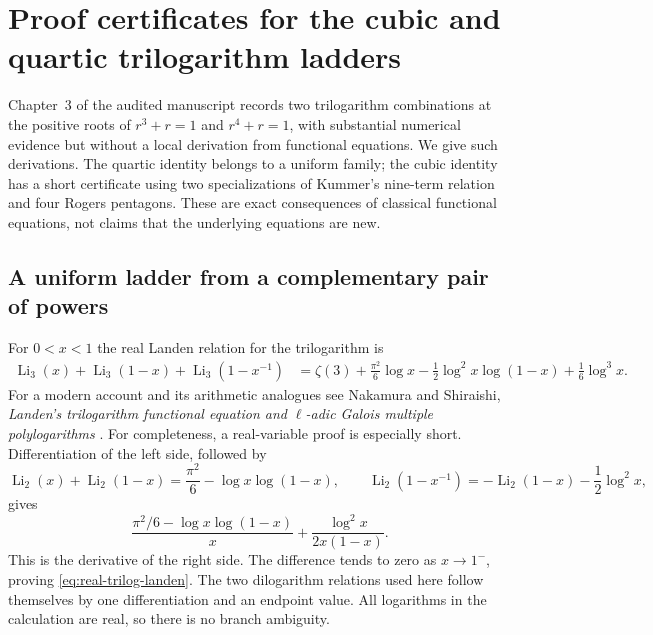 
\section{Proof certificates for the cubic and quartic trilogarithm ladders}
\label{sec:proved-small-ladders}

Chapter~3 of the audited manuscript records two trilogarithm combinations
at the positive roots of $r^3+r=1$ and $r^4+r=1$, with substantial numerical
evidence but without a local derivation from functional equations.
We give such derivations. The quartic identity belongs to a uniform
family; the cubic identity has a short certificate using two
specializations of Kummer's nine-term relation and four Rogers pentagons.
These are exact consequences of classical functional equations, not
claims that the underlying equations are new.

\subsection{A uniform ladder from a complementary pair of powers}

For $0<x<1$ the real Landen relation for the trilogarithm is
\begin{align}
\operatorname{Li}_3(x)+\operatorname{Li}_3(1-x)
 +\operatorname{Li}_3(1-x^{-1})
 &=\zeta(3)+\frac{\pi^2}{6}\log x
 -\frac12\log^2x\log(1-x)+\frac16\log^3x.
\label{eq:real-trilog-landen}
\end{align}
For a modern account and its arithmetic analogues see
Nakamura and Shiraishi, \emph{Landen's trilogarithm functional equation
and $\ell$-adic Galois multiple polylogarithms} \cite{NakamuraShiraishi}.
For completeness, a real-variable proof is especially short.
Differentiation of the left side, followed by
\[
\operatorname{Li}_2(x)+\operatorname{Li}_2(1-x)
 =\frac{\pi^2}{6}-\log x\log(1-x),\qquad
\operatorname{Li}_2(1-x^{-1})
 =-\operatorname{Li}_2(1-x)-\frac12\log^2x,
\]
gives
\[
\frac{\pi^2/6-\log x\log(1-x)}{x}
  +\frac{\log^2x}{2x(1-x)}.
\]
This is the derivative of the right side. The difference tends to zero
as $x\to1^-$, proving \eqref{eq:real-trilog-landen}. The two dilogarithm
relations used here follow themselves by one differentiation and an
endpoint value. All logarithms in the calculation are real, so there
is no branch ambiguity.

